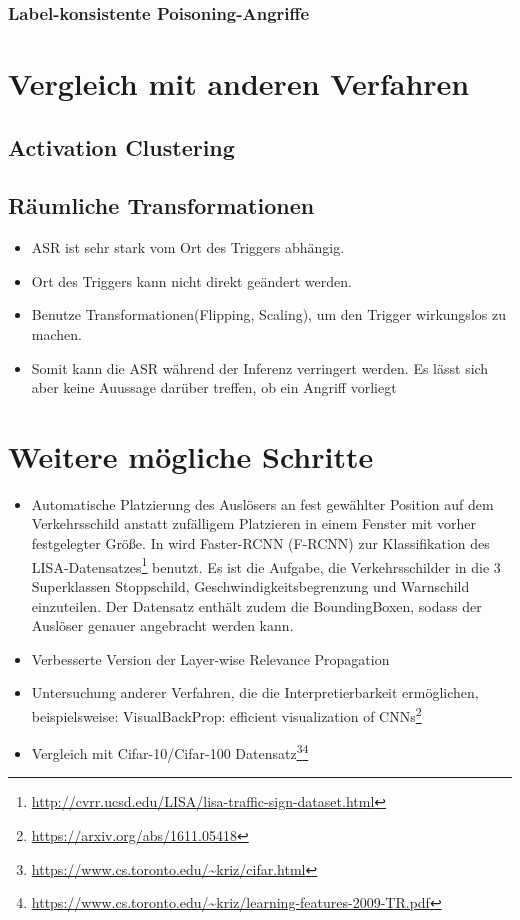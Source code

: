 \documentclass[twoside, 12pt,a4paper]{article}
\numberwithin{equation}{section}
\begin{document}
	\begin{center}
		
	\end{center}
	
	
	\subsubsection{Label-konsistente Poisoning-Angriffe}
	\section{Vergleich mit anderen Verfahren} \label{chapter_comparisons}
	\subsection{Activation Clustering}
	\subsection{Räumliche Transformationen}
	\begin{itemize}
		\item ASR ist sehr stark vom Ort des Triggers abhängig.
		\item Ort des Triggers kann nicht direkt geändert werden.
		\item Benutze Transformationen(Flipping, Scaling), um den Trigger wirkungslos zu machen.
		\item Somit kann die ASR während der Inferenz verringert werden. Es lässt sich aber keine Auussage darüber treffen, ob ein Angriff vorliegt
	\end{itemize}
	
	\section{Weitere mögliche Schritte} \label{chapter_weitereSchritte}
	\begin{itemize}
		\item Automatische Platzierung des Auslösers an fest gewählter Position auf dem Verkehrsschild anstatt zufälligem Platzieren in einem Fenster mit vorher festgelegter Größe. In \cite{badnets} wird  Faster-RCNN (F-RCNN) zur Klassifikation des LISA-Datensatzes\footnote{\url{http://cvrr.ucsd.edu/LISA/lisa-traffic-sign-dataset.html}} benutzt. Es ist die Aufgabe, die Verkehrsschilder in die 3 Superklassen Stoppschild, Geschwindigkeitsbegrenzung und Warnschild einzuteilen. Der Datensatz enthält zudem die BoundingBoxen, sodass der Auslöser genauer angebracht werden kann.
		\item Verbesserte Version der Layer-wise Relevance Propagation
		\item Untersuchung anderer Verfahren, die die Interpretierbarkeit ermöglichen, beispielsweise: VisualBackProp: efficient visualization of CNNs\footnote{\url{https://arxiv.org/abs/1611.05418}}
		\item Vergleich mit Cifar-10/Cifar-100 Datensatz\footnote{\url{https://www.cs.toronto.edu/~kriz/cifar.html}}\footnote{\url{https://www.cs.toronto.edu/~kriz/learning-features-2009-TR.pdf}}
	\end{itemize}
\end{document}
